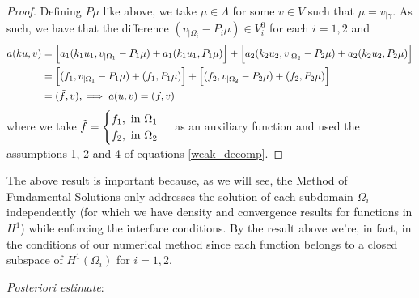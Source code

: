 \begin{proof}
    Defining \(P \mu\) like above, we take \(\mu \in \Lambda\) for some \(v \in V\) such that \(\mu = v_{|\gamma}\). As such, we have that the difference \((v_{|\Omega_i} - P_i \mu) \in V^0_i\) for each \(i=1, 2\) and
    \begin{align*}
        a(k u, v) &= \Big[a_1(k_1 u_1, v_{|\Omega_1} - P_1 \mu) + a_1(k_1 u_1, P_1\mu)\Big] + \Big[a_2(k_2 u_2, v_{|\Omega_2} - P_2 \mu) + a_2(k_2 u_2, P_2\mu)\Big]\\
        &=\Big[(f_1, v_{|\Omega_1} - P_1 \mu) + (f_1, P_1 \mu) \Big] + \Big[(f_2, v_{|\Omega_2} - P_2 \mu) + (f_2, P_2 \mu) \Big]\\
        &=(\Tilde{f}, v), \implies a(u, v) = (f, v)
    \end{align*}
    where we take \(\Tilde{f} = \begin{cases}
        f_1, \text{ in } \Omega_1\\
        f_2, \text{ in } \Omega_2
    \end{cases}\)
    as an auxiliary function and used the assumptions 1, 2 and 4 of equations \eqref{weak_decomp}.
\end{proof}

\begin{remark}
    The above result is important because, as we will see, the Method of Fundamental Solutions only addresses the solution of each subdomain \(\Omega_i\) independently (for which we have density and convergence results for functions in \(H^1\)) while enforcing the interface conditions. By the result above we're, in fact, in the conditions of our numerical method since each function belongs to a closed subspace of \(H^1(\Omega_i)\) for \(i=1, 2\).
\end{remark}

\textit{Posteriori estimate}:

